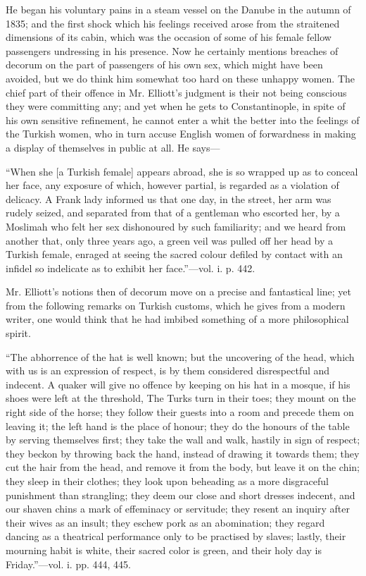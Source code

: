 He began
his voluntary pains in a steam vessel on the Danube in the autumn of
1835; and the first shock which his feelings received arose from the
straitened dimensions of its cabin, which was the occasion of some of
his female fellow passengers undressing in his presence. Now he
certainly mentions breaches of decorum on the part of passengers of his
own sex, which might have been avoided, but we do think him somewhat too
hard on these unhappy women. The chief part of their offence in Mr.
Elliott's judgment is their not being conscious they were committing
any; and yet when he gets to Constantinople, in spite of his own
sensitive refinement, he cannot enter a whit the better into the
feelings of the Turkish women, who in turn accuse English women of
forwardness in making a display of themselves in public at all. He
says—

``When
she [a Turkish female] appears abroad, she is so wrapped up as to
conceal her face, any exposure of which, however partial, is regarded as
a violation of delicacy. A Frank lady informed us that one day, in the
street, her arm was rudely seized, and separated from that of a
gentleman who escorted her, by a Moslimah who felt her sex dishonoured
by such familiarity; and we heard from another that, only three years
ago, a green veil was pulled off her head by a Turkish female, enraged
at seeing the sacred colour defiled by contact with an infidel so
indelicate as to exhibit her face.''—vol. i. p. 442.

Mr. Elliott's
notions then of decorum move on a precise and fantastical line; yet from
the following remarks on Turkish customs, which he gives from a modern
writer, one would think that he had imbibed something of a more
philosophical spirit.

``The
abhorrence of the hat is well known; but the uncovering of the head,
which with us is an expression of respect, is by them considered
disrespectful and indecent. A quaker will give no offence by keeping on
his hat in a mosque, if his shoes were left at the threshold,
The Turks turn in their toes; they mount on the
right side of the horse; they follow their guests into a room and
precede them on leaving it; the left hand is the place of honour; they
do the honours of the table by serving themselves first; they take the
wall and walk, hastily in sign of respect; they beckon by throwing back
the hand, instead of drawing it towards them; they cut the hair from the
head, and remove it from the body, but leave it on the chin; they sleep
in their clothes; they look upon beheading as a more disgraceful
punishment than strangling; they deem our close and short dresses
indecent, and our shaven chins a mark of effeminacy or servitude; they
resent an inquiry after their wives as an insult; they eschew pork as an
abomination; they regard dancing as a theatrical performance only to be
practised by slaves; lastly, their mourning habit is white, their sacred
color is green, and their holy day is Friday.''—vol. i. pp. 444, 445.

